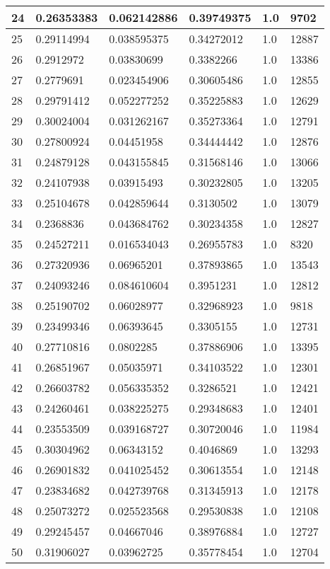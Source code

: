 \begin{longtable}{|l|l|l|l|l|l|}
24 & 0.26353383 & 0.062142886 & 0.39749375 & 1.0 & 9702 \\ \hline 
25 & 0.29114994 & 0.038595375 & 0.34272012 & 1.0 & 12887 \\ \hline 
26 & 0.2912972 & 0.03830699 & 0.3382266 & 1.0 & 13386 \\ \hline 
27 & 0.2779691 & 0.023454906 & 0.30605486 & 1.0 & 12855 \\ \hline 
28 & 0.29791412 & 0.052277252 & 0.35225883 & 1.0 & 12629 \\ \hline 
29 & 0.30024004 & 0.031262167 & 0.35273364 & 1.0 & 12791 \\ \hline 
30 & 0.27800924 & 0.04451958 & 0.34444442 & 1.0 & 12876 \\ \hline 
31 & 0.24879128 & 0.043155845 & 0.31568146 & 1.0 & 13066 \\ \hline 
32 & 0.24107938 & 0.03915493 & 0.30232805 & 1.0 & 13205 \\ \hline 
33 & 0.25104678 & 0.042859644 & 0.3130502 & 1.0 & 13079 \\ \hline 
34 & 0.2368836 & 0.043684762 & 0.30234358 & 1.0 & 12827 \\ \hline 
35 & 0.24527211 & 0.016534043 & 0.26955783 & 1.0 & 8320 \\ \hline 
36 & 0.27320936 & 0.06965201 & 0.37893865 & 1.0 & 13543 \\ \hline 
37 & 0.24093246 & 0.084610604 & 0.3951231 & 1.0 & 12812 \\ \hline 
38 & 0.25190702 & 0.06028977 & 0.32968923 & 1.0 & 9818 \\ \hline 
39 & 0.23499346 & 0.06393645 & 0.3305155 & 1.0 & 12731 \\ \hline 
40 & 0.27710816 & 0.0802285 & 0.37886906 & 1.0 & 13395 \\ \hline 
41 & 0.26851967 & 0.05035971 & 0.34103522 & 1.0 & 12301 \\ \hline 
42 & 0.26603782 & 0.056335352 & 0.3286521 & 1.0 & 12421 \\ \hline 
43 & 0.24260461 & 0.038225275 & 0.29348683 & 1.0 & 12401 \\ \hline 
44 & 0.23553509 & 0.039168727 & 0.30720046 & 1.0 & 11984 \\ \hline 
45 & 0.30304962 & 0.06343152 & 0.4046869 & 1.0 & 13293 \\ \hline 
46 & 0.26901832 & 0.041025452 & 0.30613554 & 1.0 & 12148 \\ \hline 
47 & 0.23834682 & 0.042739768 & 0.31345913 & 1.0 & 12178 \\ \hline 
48 & 0.25073272 & 0.025523568 & 0.29530838 & 1.0 & 12108 \\ \hline 
49 & 0.29245457 & 0.04667046 & 0.38976884 & 1.0 & 12727 \\ \hline 
50 & 0.31906027 & 0.03962725 & 0.35778454 & 1.0 & 12704 \\ \hline 
\end{longtable}